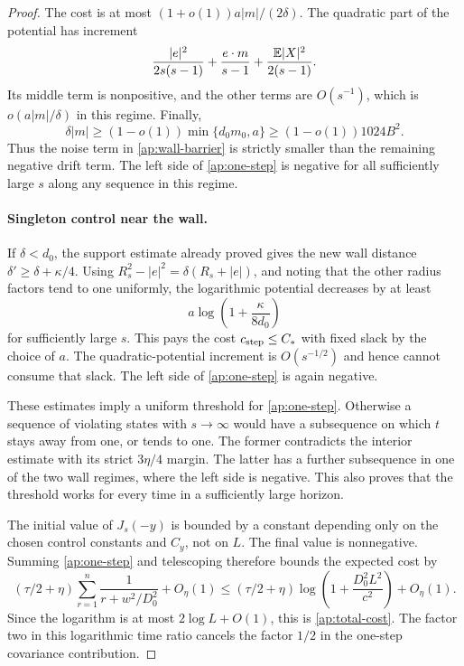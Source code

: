 \begin{proof}
The cost is at most
\((1+o(1))a|m|/(2\delta)\).  The quadratic part of the potential
has increment
\[
 \frac{|e|^2}{2s(s-1)}+\frac{e\cdot m}{s-1}
                       +\frac{\mathbb E|X|^2}{2(s-1)}.
\]
Its middle term is nonpositive, and the other terms are \(O(s^{-1})\),
which is \(o(a|m|/\delta)\) in this regime.  Finally,
\[
 \delta|m|\geq(1-o(1))\min\{d_0m_0,a\}
                  \geq(1-o(1))1024B^2.
\]
Thus the noise term in \eqref{ap:wall-barrier} is strictly smaller
than the remaining negative drift term.  The left side of
\eqref{ap:one-step} is negative for all sufficiently large \(s\)
along any sequence in this regime.

\paragraph{Singleton control near the wall.}
If \(\delta<d_0\), the support estimate already proved gives the new
wall distance \(\delta'\geq\delta+\kappa/4\).  Using
\(R_s^2-|e|^2=\delta(R_s+|e|)\), and noting that the other radius
factors tend to one uniformly, the logarithmic potential decreases by
at least
\[
 a\log\left(1+\frac{\kappa}{8d_0}\right)
\]
for sufficiently large \(s\).  This pays the cost \(c_{\rm step}\leq C_*\)
with fixed slack by the choice of \(a\).  The quadratic-potential
increment is \(O(s^{-1/2})\) and hence cannot consume that slack.
The left side of \eqref{ap:one-step} is again negative.

These estimates imply a uniform threshold for \eqref{ap:one-step}.
Otherwise a sequence of violating states with \(s\to\infty\) would
have a subsequence on which \(t\) stays away from one, or tends to one.
The former contradicts the interior estimate with its strict
\(3\eta/4\) margin.  The latter has a further subsequence in one of
the two wall regimes, where the left side is negative.  This also proves
that the threshold works for every time in a sufficiently large horizon.

The initial value of \(J_s(-y)\) is bounded by a constant depending
only on the chosen control constants and \(C_y\), not on \(L\).
The final value is nonnegative.  Summing \eqref{ap:one-step} and
telescoping therefore bounds the expected cost by
\[
 (\tau/2+\eta)\sum_{r=1}^n
   \frac1{r+w^2/D_0^2}+O_\eta(1)
 \leq(\tau/2+\eta)
   \log\left(1+\frac{D_0^2L^2}{c^2}\right)+O_\eta(1).
\]
Since the logarithm is at most \(2\log L+O(1)\), this is
\eqref{ap:total-cost}.  The factor two in this logarithmic time ratio
cancels the factor \(1/2\) in the one-step covariance contribution.
\end{proof}

